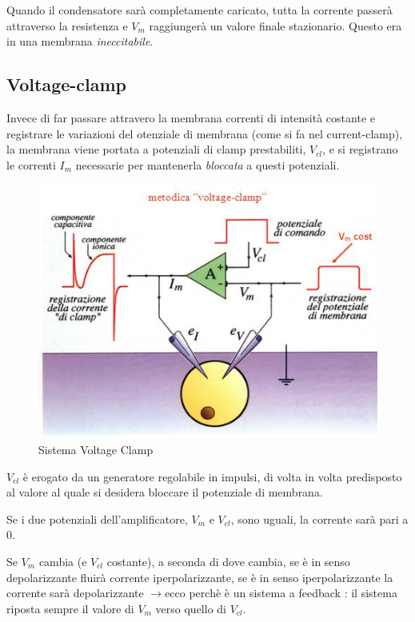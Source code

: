 \documentclass[a4paper,12pt]{article}
\newcommand{\lfreccia}{\ensuremath{\longrightarrow}}
\begin{document}
Quando il condensatore sarà completamente caricato, tutta la corrente passerà attraverso la resistenza e $V_{m}$ raggiungerà un valore finale stazionario.
Questo era in una membrana \emph{ineccitabile}.

\subsection{Voltage-clamp}
Invece di far passare attravero la membrana correnti di intensità costante e registrare le variazioni del otenziale di membrana (come si fa nel current-clamp), la membrana viene portata a potenziali di clamp prestabiliti, $V_{cl}$, e si registrano le correnti $I_{m}$ necessarie per mantenerla \emph{bloccata} a questi potenziali.

\begin{figure}[H]
\centering
\includegraphics[scale=0.5]{immagine/img1.jpg}
\caption{Sistema Voltage Clamp}
\end{figure}
$V_{cl}$ è erogato da un generatore regolabile in impulsi, di volta in volta predisposto al valore al quale si desidera bloccare il potenziale di membrana.

Se i due potenziali dell'amplificatore, $V_{m}$ e $V_{cl}$, sono uguali, la corrente sarà pari a 0.

Se $V_{m}$ cambia (e $V_{cl}$ costante), a seconda di dove cambia, se è in senso depolarizzante fluirà corrente iperpolarizzante, se è in senso iperpolarizzante la corrente sarà depolarizzante \lfreccia ecco perchè è un sistema a feedback : il sistema riposta sempre il valore di $V_{m}$ verso quello di $V_{cl}$.
\end{document}
